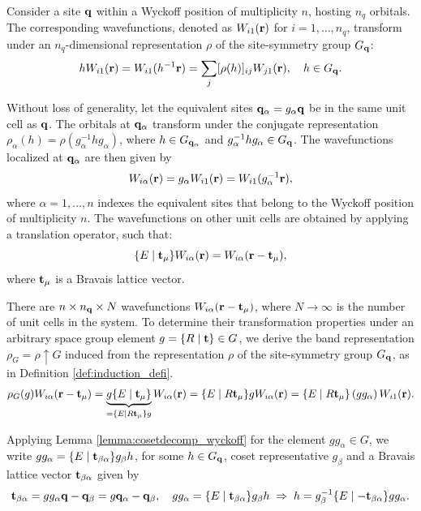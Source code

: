Consider a site \({\vb{q}}\) within a Wyckoff position of multiplicity \(n\), hosting \(n_q\) orbitals. The corresponding wavefunctions, denoted as \(W_{i1}({\vb{r}})\) for \(i = 1, \ldots, n_q\), transform under an \(n_q\)-dimensional representation \(\rho\) of the site-symmetry group \(G_{\vb{q}}\):
\begin{equation} \label{eq:gWi1_nq_rep}
h W_{i1}({\vb{r}}) = W_{i1}(h^{-1} {\vb{r}}) = \sum_{j} [\rho(h)]_{ij} W_{j1}({\vb{r}}), \quad h \in G_{\vb{q}}.
\end{equation}

Without loss of generality, let the equivalent sites \({\vb{q}}_\alpha = g_{\alpha} {\vb{q}}\) be in the same unit cell as \({\vb{q}}\). The orbitals at \({\vb{q}}_\alpha\) transform under the conjugate representation \(\rho_\alpha(h) = \rho(g_\alpha^{-1} h g_\alpha)\), where \(h \in G_{{\vb{q}}_\alpha}\) and \(g_\alpha^{-1} h g_\alpha \in G_{\vb{q}}\). The wavefunctions localized at \({\vb{q}}_\alpha\) are then given by
\begin{equation} \label{eq:Wialpha_galpha_action}
W_{i\alpha}({\vb{r}}) = g_\alpha W_{i1}({\vb{r}}) = W_{i1}(g_\alpha^{-1} {\vb{r}}),
\end{equation}
where \(\alpha = 1, \ldots, n\) indexes the equivalent sites that belong to the Wyckoff position of multiplicity \(n\). The wavefunctions on other unit cells are obtained by applying a translation operator, such that:
\begin{equation} \label{eq:translated_Wialpha}
\{ E \mid {\vb{t}}_\mu \} W_{i\alpha}({\vb{r}}) = W_{i\alpha}({\vb{r}}-{\vb{t}}_\mu),
\end{equation}
where ${\vb{t}}_\mu$ is a Bravais lattice vector.

There are \(n \times n_{\vb{q}} \times N\) wavefunctions \(W_{i\alpha}({\vb{r}} - {\vb{t}}_\mu)\), where \(N \to \infty\) is the number of unit cells in the system. To determine their transformation properties under an arbitrary space group element \(g = \{ R \mid {\vb{t}} \} \in G\), we derive the band representation \(\rho_G = \rho \uparrow G\) induced from the representation \(\rho\) of the site-symmetry group \(G_{\vb{q}}\), as in Definition \ref{def:induction_defi}.
\begin{equation} \label{eq:induced_rho_G_wannier_step1}
\rho_G(g) W_{i\alpha}({\vb{r}}-{\vb{t}}_\mu) =
\underbrace{g \{ E \mid {\vb{t}}_\mu \}}_{= \{ E \mid R{\vb{t}}_\mu \} g} W_{i\alpha} ({\vb{r}}) =
\{ E \mid R{\vb{t}}_\mu \} g W_{i\alpha} ({\vb{r}}) =
\{ E \mid R{\vb{t}}_\mu \} \, (g g_\alpha) \, W_{i1} ({\vb{r}}).
\end{equation}

Applying Lemma \ref{lemma:cosetdecomp_wyckoff} for the element $g g_\alpha \in G$, we write $g g_\alpha = \{ E \mid {\vb{t}}_{\beta\alpha} \} g_\beta h$, for some $h \in G_{\vb{q}}$, coset representative $g_\beta$ and a Bravais lattice vector ${\vb{t}}_{\beta\alpha}$ given by
\begin{equation} \label{eq:t_betaalpha}
{\vb{t}}_{\beta\alpha} = gg_\alpha {\vb{q}} - {\vb{q}}_\beta = g {\vb{q}}_\alpha - {\vb{q}}_\beta, \quad
g g_\alpha = \{ E \mid {\vb{t}}_{\beta\alpha} \} g_\beta h \; \Rightarrow \; h = g_\beta^{-1} \{E\mid -{\vb{t}}_{\beta\alpha}\} g g_\alpha.
\end{equation}

